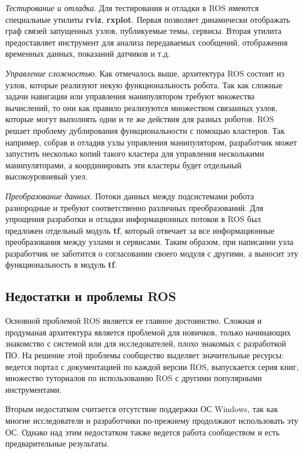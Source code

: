 \documentclass[10pt, a5paper]{article}
\begin{document}
\emph{Тестирование и отладка}. Для тестирования и отладки в ROS имеются специальные утилиты \textbf{rviz}, \textbf{rxplot}. Первая позволяет динамически отображать граф связей запущенных узлов, публикуемые темы, сервисы. Вторая утилита предоставляет инструмент для анализа передаваемых сообщений, отображения временных данных, показаний датчиков и т.д.

\emph{Управление сложностью}. Как отмечалось выше, архитектура ROS состоит из узлов, которые реализуют некую функциональность робота. Так как сложные задачи навигации или управления манипулятором требуют множества вычислений, то они как правило реализуются множеством связанных узлов, которые могут выполнять одни и те же действия для разных роботов. ROS решает проблему дублирования функциональности с помощью кластеров. Так например, собрав и отладив узлы управления манипулятором, разработчик может запустить несколько копий такого кластера для управления несколькими манипуляторами, а координировать эти кластеры будет отдельный высокоуровневый узел.

\emph{Преобразование данных}. Потоки данных между подсистемами робота разнородные и требуют соответственно различных преобразований. Для упрощения разработки и отладки информационных потоков в ROS был предложен отдельный модуль \textbf{tf}, который отвечает за все информационные преобразования между узлами и сервисами. Таким образом, при написании узла разработчик не заботится о согласовании своего модуля с другими, а выносит эту функциональность в модуль \textbf{tf}.

\subsection*{Недостатки и проблемы ROS}

Основной проблемой ROS является ее главное достоинство. Сложная и продуманая архитектура является проблемой для новичков, только начинающих знакомство с системой или для исследователей, плохо знакомых с разработкой ПО. На решение этой проблемы сообщество выделяет значительные ресурсы: ведется портал с документацией по каждой версии ROS, выпускается серия книг, множество туториалов по использованию ROS с другими популярными инструментами.

Вторым недостатком считается отсутствие поддержки ОС Windows, так как многие исследователи и разработчики по-прежнему продолжают использовать эту ОС. Однако над этим недостатком также ведется работа сообществом и есть предварительные результаты.
\end{document}
